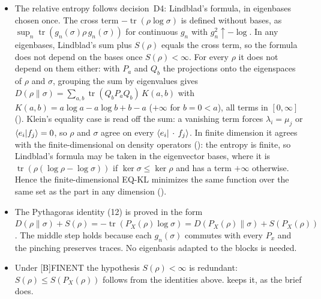 \documentclass[11pt]{article}
\begin{document}
\begin{itemize}
  measurement bound $\|\sigma - Q\sigma Q\|_1 \le (1 - \operatorname{tr}(Q\sigma))/\eta + \eta$
  (cf.\ Winter 1999, Lemma~9), obtained by averaging the pure-state bound
  $\||c\rangle\langle c| - |Qc\rangle\langle Qc|\|_1 \le 2\|c - Qc\|$ over the spectral expansion
  of $\sigma$. That $\rho(t)$ is a density operator follows from the Gaussian representation:
  the average of positive operators is positive, and its trace is that of its pinching, which
  is $P_X(\rho)$.
\item The relative entropy follows decision~D4: Lindblad's formula, in eigenbases chosen once.
  The cross term $-\operatorname{tr}(\rho\log\sigma)$ is defined without bases, as
  $\sup_n \operatorname{tr}(g_n(\sigma)\rho\,g_n(\sigma))$ for continuous $g_n$ with
  $g_n^2 \uparrow -\log$. In any eigenbases, Lindblad's sum plus $S(\rho)$ equals the cross term,
  so the formula does not depend on the bases once $S(\rho) < \infty$. For every $\rho$ it does
  not depend on them either: with $P_a$ and $Q_b$ the projections onto the eigenspaces of $\rho$
  and $\sigma$, grouping the sum by eigenvalues gives
  $D(\rho\|\sigma) = \sum_{a,b}\operatorname{tr}(Q_bP_aQ_b)\,K(a,b)$ with
  $K(a,b) = a\log a - a\log b + b - a$ ($+\infty$ for $b = 0 < a$), all terms in $[0,\infty]$
  (). Klein's equality case is read off the sum: a
  vanishing term
  forces $\lambda_i = \mu_j$ or $\braket{e_i|f_j} = 0$, so $\rho$ and $\sigma$ agree on every
  $\braket{e_i|\,\cdot\,f_j}$. In finite dimension it agrees with the finite-dimensional
   on density operators (): the entropy is
  finite, so Lindblad's formula may be taken in the eigenvector bases, where it is
  $\operatorname{tr}(\rho(\log\rho - \log\sigma))$ if $\ker\sigma \le \ker\rho$ and has a term
  $+\infty$ otherwise. Hence the finite-dimensional EQ-KL minimizes the same function over the
  same set as the part in any dimension ().
\item The Pythagoras identity (12) is proved in the form $D(\rho\|\sigma) + S(\rho) =
  -\operatorname{tr}(P_X(\rho)\log\sigma) = D(P_X(\rho)\|\sigma) + S(P_X(\rho))$. The middle step
  holds because each $g_n(\sigma)$ commutes with every $P_x$ and the pinching preserves traces. No
  eigenbasis adapted to the blocks is needed.
\item Under [B]FINENT the hypothesis $S(\rho) < \infty$ is redundant: $S(\rho) \le
  S(P_X(\rho))$ follows from the identities above.  keeps it, as the brief does.

\end{itemize}
\end{document}
